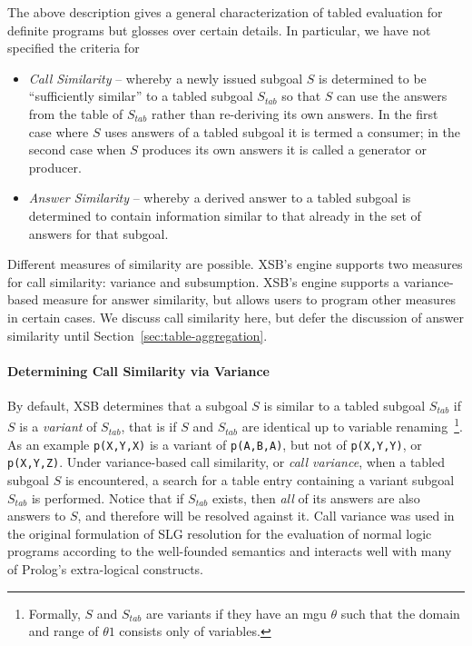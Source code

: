 The above description gives a general characterization of tabled
evaluation for definite programs but glosses over certain details.  In
particular, we have not specified the criteria for 
\begin{itemize}
\item {\em Call Similarity} -- whereby a newly issued subgoal $S$ is
  determined to be ``sufficiently similar'' to a tabled subgoal
  $S_{tab}$ so that $S$ can use the answers from the table of
  $S_{tab}$ rather than re-deriving its own answers.  In the first
  case where $S$ uses answers of a tabled subgoal it is termed a
  consumer; in the second case when $S$ produces its own answers it is
  called a generator or producer.
%
\item {\em Answer Similarity} -- whereby a derived answer to a tabled
  subgoal is determined to contain information similar to that already
  in the set of answers for that subgoal.
\end{itemize}
Different measures of similarity are possible.  XSB's engine supports
two measures for call similarity: variance and subsumption.  XSB's
engine supports a variance-based measure for answer similarity, but
allows users to program other measures in certain cases.  We discuss
call similarity here, but defer the discussion of answer similarity
until Section~\ref{sec:table-aggregation}.


\paragraph{Determining Call Similarity via Variance}
%
By default, XSB determines that a subgoal $S$ is similar to a tabled
subgoal $S_{tab}$ if $S$ is a {\em variant} of $S_{tab}$, that is if
$S$ and $S_{tab}$ are identical up to variable
renaming~\footnote{Formally, $S$ and $S_{tab}$ are variants if they
  have an mgu $\theta$ such that the domain and range of $\theta1$
  consists only of variables.}.  As an example {\tt p(X,Y,X)} is a
variant of {\tt p(A,B,A)}, but not of {\tt p(X,Y,Y)}, or {\tt
  p(X,Y,Z)}.  Under variance-based call similarity, or {\em call
  variance}, when a tabled subgoal $S$ is encountered, a search for a
table entry containing a variant subgoal $S_{tab}$ is performed.
Notice that if $S_{tab}$ exists, then \emph{all} of its answers are
also answers to $S$, and therefore will be resolved against it.  Call
variance was used in the original formulation of SLG resolution
\cite{ChWa96} for the evaluation of normal logic programs according to
the well-founded semantics and interacts well with many of Prolog's
extra-logical constructs.



